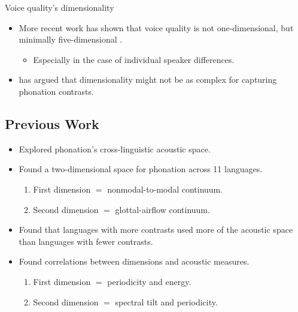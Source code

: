 \documentclass{beamer}
\begin{document}
\begin{frame}{Voice quality's dimensionality}
  \begin{itemize}
    \item More recent work has shown that voice quality is not one-dimensional, but minimally five-dimensional \citep[e.g.,][]{garellekModelingVoiceSource2016,kreimanValidatingPsychoacousticModel2021}.
    \begin{itemize}
      \item Especially in the case of individual speaker differences.
    \end{itemize}
    \item \citet{garellekVoiceQualityTone2013} has argued that dimensionality might not be as complex for capturing phonation contrasts.
  \end{itemize}
\end{frame}


\subsection{Previous Work}
\begin{frame}{\citet{keatingCrosslanguageAcousticSpace2023}}
  \begin{itemize}
    \item Explored phonation's cross-linguistic acoustic space.
    \item Found a two-dimensional space for phonation across 11 languages.
    \begin{enumerate}
      \item First dimension $=$ nonmodal-to-modal continuum.
      \item Second dimension $=$ glottal-airflow continuum.
    \end{enumerate}
    \item Found that languages with more contrasts used more of the acoustic space than languages with fewer contrasts.
    \item Found correlations between dimensions and acoustic measures.
    \begin{enumerate}
      \item First dimension $=$ periodicity and energy.
      \item Second dimension $=$ spectral tilt and periodicity.
    \end{enumerate}
  \end{itemize}
\end{frame}
\end{document}
